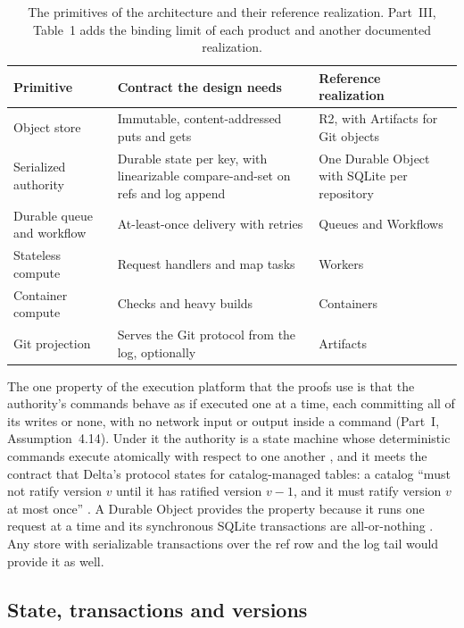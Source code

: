 \documentclass[11pt,letterpaper]{article}
\theoremstyle{definition}
\theoremstyle{remark}
\begin{document}
\begin{table}[t]
\centering
\small
\caption{The primitives of the architecture and their reference realization. Part~III, Table~1 adds the binding limit of each product and another documented realization.}
\label{tab:syn:primitives}
\begin{tabularx}{\textwidth}{@{}L{3.0cm}YL{3.6cm}@{}}
\toprule
Primitive & Contract the design needs & Reference realization \\
\midrule
Object store & Immutable, content-addressed puts and gets & R2, with Artifacts for Git objects \\
Serialized authority & Durable state per key, with linearizable compare-and-set on refs and log append & One Durable Object with SQLite per repository \\
Durable queue and workflow & At-least-once delivery with retries & Queues and Workflows \\
Stateless compute & Request handlers and map tasks & Workers \\
Container compute & Checks and heavy builds & Containers \\
Git projection & Serves the Git protocol from the log, optionally & Artifacts \\
\bottomrule
\end{tabularx}
\end{table}

The one property of the execution platform that the proofs use is that the authority's commands behave as if executed one at a time, each committing all of its writes or none, with no network input or output inside a command (Part~I, Assumption~4.14). Under it the authority is a state machine whose deterministic commands execute atomically with respect to one another \cite{schneider1990}, and it meets the contract that Delta's protocol states for catalog-managed tables: a catalog ``must not ratify version $v$ until it has ratified version $v-1$, and it must ratify version $v$ at most once'' \cite{deltaprotocol}. A Durable Object provides the property because it runs one request at a time and its synchronous SQLite transactions are all-or-nothing \cite{cfdoconcepts,cfdosqlite}. Any store with serializable transactions over the ref row and the log tail would provide it as well.

\subsection{State, transactions and versions}
\end{document}
